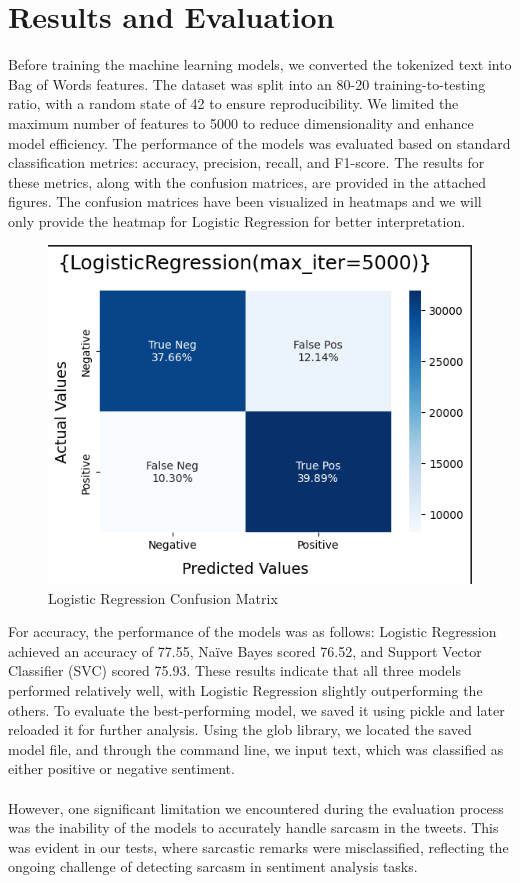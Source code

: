 \documentclass[conference]{IEEEtran}
\begin{document}
\section{Results and Evaluation}
Before training the machine learning models, we converted the tokenized text into Bag of Words features. 
The dataset was split into an 80-20 training-to-testing ratio, with a random state of 42 to ensure reproducibility. 
We limited the maximum number of features to 5000 to reduce dimensionality and enhance model efficiency. 
The performance of the models was evaluated based on standard classification metrics: accuracy, precision, recall, and F1-score. 
The results for these metrics, along with the confusion matrices, are provided in the attached figures. 
The confusion matrices have been visualized in heatmaps and we will only provide the heatmap for Logistic Regression for better interpretation.
\begin{figure}[H]
        \centering
        \includegraphics[width=\linewidth]{assets/LR_ConfusionMatrix.png}
        \caption{Logistic Regression Confusion Matrix}
        \label{fig:Logistic_Regression_Confusion_Matrix}
    \end{figure}

For accuracy, the performance of the models was as follows: Logistic Regression achieved an accuracy of 77.55, 
Naïve Bayes scored 76.52, and Support Vector Classifier (SVC) scored 75.93. These results indicate that all three models performed relatively well, 
with Logistic Regression slightly outperforming the others. To evaluate the best-performing model, we saved it using pickle and later reloaded it for further analysis. 
Using the glob library, we located the saved model file, and through the command line, we input text, which was classified as either positive or 
negative sentiment.
\\
\\
However, one significant limitation we encountered during the evaluation process was the inability of the models to accurately handle sarcasm in the tweets. 
This was evident in our tests, where sarcastic remarks were misclassified, reflecting the ongoing challenge of detecting sarcasm in sentiment analysis tasks.
\end{document}
